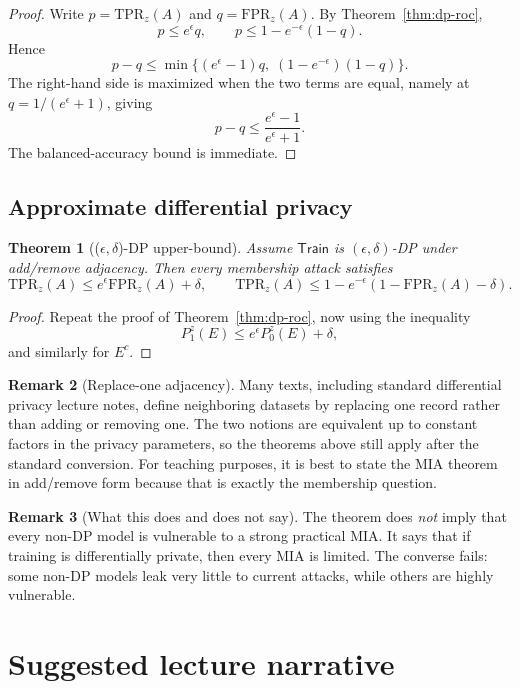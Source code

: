 \documentclass[11pt]{article}
\newtheorem{theorem}{Theorem}[section]
\theoremstyle{definition}
\newtheorem{remark}[theorem]{Remark}
\newcommand{\1}{\mathbf{1}}
\newcommand{\Train}{\mathsf{Train}}
\newcommand{\TPR}{\mathrm{TPR}}
\newcommand{\FPR}{\mathrm{FPR}}
\begin{document}
\begin{proof}
Write $p=\TPR_z(A)$ and $q=\FPR_z(A)$. By Theorem~\ref{thm:dp-roc},
\[
p \le e^{\epsilon} q, \qquad p \le 1 - e^{-\epsilon}(1-q).
\]
Hence
\[
p-q \le \min\{(e^{\epsilon}-1)q,\; (1-e^{-\epsilon})(1-q)\}.
\]
The right-hand side is maximized when the two terms are equal, namely at $q=1/(e^{\epsilon}+1)$, giving
\[
p-q \le \frac{e^{\epsilon}-1}{e^{\epsilon}+1}.
\]
The balanced-accuracy bound is immediate.
\end{proof}

\subsection{Approximate differential privacy}

\begin{theorem}[(\(\epsilon,\delta\))-DP upper-bound]
Assume $\Train$ is $(\epsilon,\delta)$-DP under add/remove adjacency. Then every membership attack satisfies
\[
\TPR_z(A) \le e^{\epsilon} \FPR_z(A) + \delta,
\qquad
\TPR_z(A) \le 1 - e^{-\epsilon}(1-\FPR_z(A)-\delta).
\]
\end{theorem}

\begin{proof}
Repeat the proof of Theorem~\ref{thm:dp-roc}, now using the inequality
\[
P_1^z(E) \le e^{\epsilon} P_0^z(E) + \delta,
\]
and similarly for $E^c$.
\end{proof}

\begin{remark}[Replace-one adjacency]
Many texts, including standard differential privacy lecture notes, define neighboring datasets by replacing one record rather than adding or removing one. The two notions are equivalent up to constant factors in the privacy parameters, so the theorems above still apply after the standard conversion. For teaching purposes, it is best to state the MIA theorem in add/remove form because that is exactly the membership question.
\end{remark}

\begin{remark}[What this does and does not say]
The theorem does \emph{not} imply that every non-DP model is vulnerable to a strong practical MIA. It says that if training is differentially private, then every MIA is limited. The converse fails: some non-DP models leak very little to current attacks, while others are highly vulnerable.
\end{remark}

\section{Suggested lecture narrative}
\end{document}
